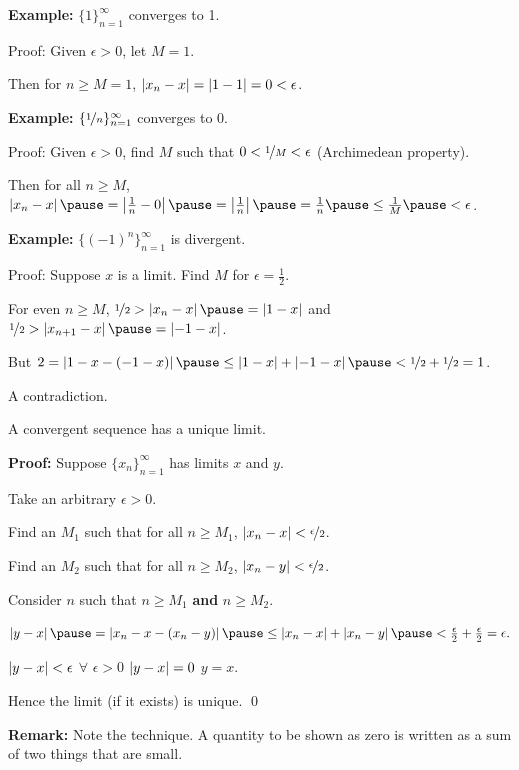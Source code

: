\documentclass[10pt,aspectratio=149]{beamer}
\begin{document}
\begin{frame}
\textbf{Example:}
$\{ 1 \}_{n=1}^\infty$ converges to 1.  \pause 

Proof: Given $\epsilon > 0$, let $M=1$.

\pause
Then for $n \geq M=1$, \quad
$\left\lvert {x_n-x} \right\rvert = \left\lvert {1-1} \right\rvert = 0 < \epsilon$.

\medskip
\pause

\textbf{Example:}
$\{ \nicefrac{1}{n} \}_{n=1}^\infty$ converges to 0.

\pause
Proof: Given $\epsilon > 0$, find $M$ such that
$0 < \nicefrac{1}{M} < \epsilon$ (Archimedean property).

\pause
Then for all $n \geq M$,
\quad
$\abs{x_n - x}
\pause
= \abs{\frac{1}{n} - 0}
\pause
= \abs{\frac{1}{n}}
\pause
= \frac{1}{n}
\pause
\leq \frac{1}{M}
\pause < \epsilon$.

\medskip
\pause

\textbf{Example:}
$\{ {(-1)}^n \}_{n=1}^\infty$ is divergent.

\pause
Proof: Suppose $x$ is a limit.  Find $M$ for $\epsilon = \frac{1}{2}$.

\pause
For even $n \geq M$,
\quad
$\nicefrac{1}{2} > \abs{x_n - x} \pause  = \abs{1 - x}$
\pause
\quad  and \quad 
$\nicefrac{1}{2} > \abs{x_{n+1} - x} \pause  = \abs{-1 - x}$.

\pause
But
\quad
$2 = \abs{1 - x - (-1 -x)} \pause \leq \abs{1 - x} + \abs{-1 -x} \pause <
\nicefrac{1}{2} + \nicefrac{1}{2} = 1$.

\pause
A contradiction.
\end{frame}

\begin{frame}

\begin{proposition}
A convergent sequence has a unique limit.
\end{proposition}

\pause

\textbf{Proof:}
Suppose $\{ x_n \}_{n=1}^\infty$ has limits $x$ and $y$.

\pause
Take an arbitrary $\epsilon > 0$.

\pause
Find an $M_1$ such that for all $n \geq M_1$,
\quad
$\left\lvert {x_n-x} \right\rvert < \nicefrac{\epsilon}{2}$.


\pause
Find an $M_2$ such that for all $n \geq M_2$,
\quad
$\left\lvert {x_n-y} \right\rvert < \nicefrac{\epsilon}{2}$.

\pause
Consider $n$ such that $n \geq M_1$ \textbf{and} $n \geq M_2$.

\pause
$
\abs{y-x}
\pause =
\abs{x_n-x - (x_n -y)}
\pause \leq
\abs{x_n-x} + \abs{x_n -y}
\pause <
\frac{\epsilon}{2} + \frac{\epsilon}{2} = \epsilon .
$

\pause
$\left\lvert {y-x} \right\rvert < \epsilon$ $\forall$  $\epsilon > 0$ \wthus $\left\lvert {y-x} \right\rvert = 0$
\pause
\wthus $y=x$.

\pause
Hence the limit (if it exists) is unique.
\qed

\medskip
\pause

\textbf{Remark:} Note the technique.  A quantity to be shown as zero is
written as a sum of two things that are small.
\end{frame}
\end{document}
